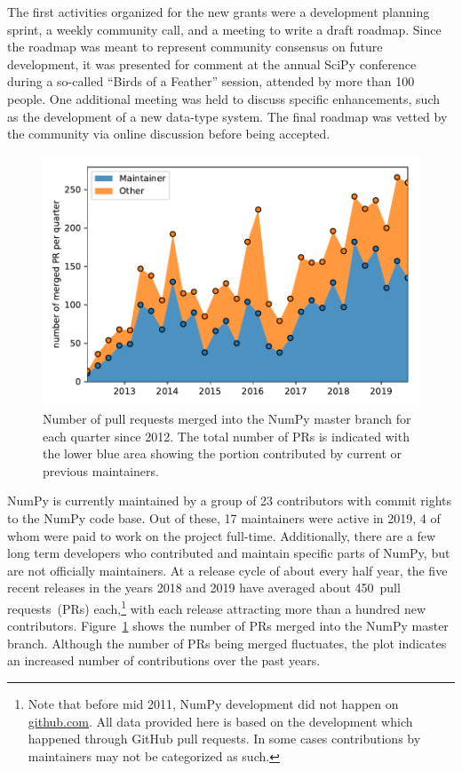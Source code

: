 The first activities organized for the new grants were a development planning
sprint, a weekly community call, and a meeting to write a draft roadmap.
Since the roadmap was meant to represent community consensus on future
development, it was presented for comment at the annual SciPy
conference during a so-called ``Birds of a Feather'' session, attended
by more than 100 people.  One additional meeting was held to discuss
specific enhancements, such as the development of a new data-type
system.  The final roadmap was vetted by the community via online
discussion before being accepted.

\begin{figure}
    \centering
    \includegraphics[width=0.9\linewidth]{scripts/PRs-using-CURRENT_MAINTAINERS.pdf}
    \caption{Number of pull requests merged into the NumPy master branch for each
        quarter since 2012. The total number of PRs is indicated with the
        lower blue area showing the portion contributed by current or previous
        maintainers.}\label{fig:prs-over-time}
\end{figure}

NumPy is currently maintained by a group of 23 contributors with commit rights
to the NumPy code base. Out of these, 17 maintainers were active in
2019, 4 of whom were paid to work on the project full-time.
Additionally, there are a few long term developers who contributed and maintain
specific parts of NumPy, but are not officially maintainers.
At a release cycle of about every half year, the five recent releases in the years
2018 and 2019 have averaged about 450~pull requests~(PRs) each,\footnote{
    Note that before mid 2011, NumPy development did not happen on \url{github.com}.
    All data provided here is based on the development which happened through GitHub
    pull requests. In some cases contributions by maintainers may not be categorized as such.}
with each release attracting more than a hundred new contributors.
Figure~\ref{fig:prs-over-time} shows the number of PRs merged into the NumPy
master branch.
Although the number of PRs being merged fluctuates,
the plot indicates an increased number of contributions over the past
years.

